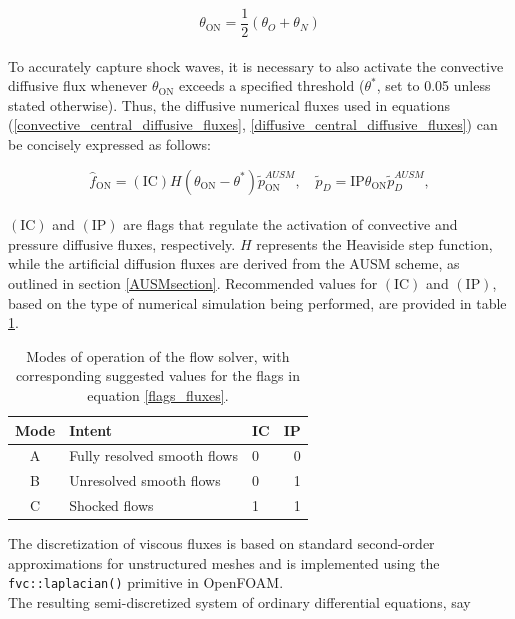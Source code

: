 \documentclass[a5paper]{sapthesis}
\begin{document}
	\begin{equation}
		\theta_{\text{ON}} = \frac{1}{2} (\theta_O +\theta_N)
	\end{equation}
	\\
	To accurately capture shock waves, it is necessary to also activate the convective diffusive flux whenever $ \theta_{\text{ON}} $ exceeds a specified threshold ($ \theta^* $, set to 0.05 unless stated otherwise). Thus, the diffusive numerical fluxes used in equations (\ref{convective_central_diffusive_fluxes}, \ref{diffusive_central_diffusive_fluxes}) can be concisely expressed as follows:
	
	\begin{equation}
		\hat{f}_{\text{ON}} = (\text{IC}) H (\theta_{\text{ON}} - \theta^*) \tilde{p}_{\text{ON}}^{AUSM}, \quad
		\tilde{p}_D = \text{IP} \theta_{\text{ON}} \tilde{p}_D^{AUSM},
		\label{flags_fluxes}
	\end{equation}
	\\
	$(\text{IC})$ and $(\text{IP})$ are flags that regulate the activation of convective and pressure diffusive fluxes, respectively. $H$ represents the Heaviside step function, while the artificial diffusion fluxes are derived from the AUSM scheme, as outlined in section \ref{AUSMsection}. Recommended values for $(\text{IC})$ and $(\text{IP})$, based on the type of numerical simulation being performed, are provided in table \ref{REF_modes}.  
	
	\begin{table}[h]
		\centering
		\renewcommand{\arraystretch}{1.4} %
		\begin{tabular}{c l l r}
			\hline
			\textbf{Mode} & \textbf{Intent} & \textbf{IC} & \textbf{IP} \\
			\hline
			A & Fully resolved smooth flows & 0 & 0 \\
			B & Unresolved smooth flows & 0 & 1 \\
			C & Shocked flows & 1 & 1 \\
			\hline
		\end{tabular}
				\vspace{3mm}
		\caption{Modes of operation of the flow solver, with corresponding	suggested values for the flags in equation \ref{flags_fluxes}.}
		\label{REF_modes}
	\end{table}
	\noindent The discretization of viscous fluxes is based on standard second-order approximations for unstructured meshes \cite{hirsch2007numerical} and is implemented using the \texttt{fvc::laplacian()} primitive in OpenFOAM.
	\\The resulting semi-discretized system of ordinary differential equations, say 
	
\end{document}
